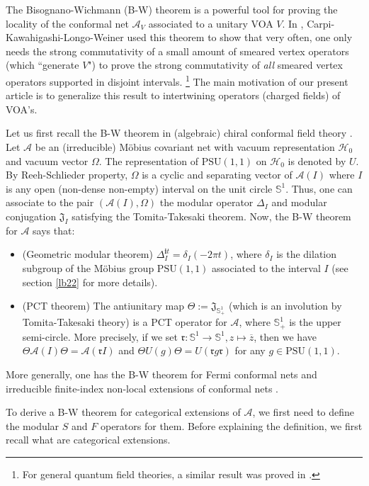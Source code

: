 \documentclass[12pt,a4paper]{article}
\theoremstyle{definition}
\theoremstyle{plain}
\newcommand{\fk}{\mathfrak}
\newcommand{\mc}{\mathcal}
\newcommand{\ovl}{\overline}
\newcommand{\PSU}{\mathrm{PSU}(1,1)}
\newcommand{\im}{\mathbf{i}}
\newcommand{\mbb}{\mathbb}
\numberwithin{equation}{section}
\begin{document}
The Bisognano-Wichmann (B-W) theorem \cite{BW75} is a powerful tool for proving the locality of the conformal net $\mc A_V$ associated to a unitary VOA $V$. In \cite{CKLW18}, Carpi-Kawahigashi-Longo-Weiner used this theorem to show that very often, one only needs the strong commutativity of a small amount of  smeared vertex operators (which ``generate $V$") to prove the strong commutativity of \emph{all} smeared vertex operators supported in disjoint intervals. \footnote{For general quantum field theories, a similar result was proved in \cite{DSW86}.} The main motivation of our present article is to generalize this result to intertwining operators (charged fields) of VOA's. 

Let us first recall the B-W theorem in (algebraic) chiral conformal field theory \cite{BGL93,GF93,FJ96}. Let $\mc A$ be an (irreducible) M\"obius covariant net with vacuum representation $\mc H_0$ and vacuum vector $\Omega$. The representation of $\PSU$ on $\mc H_0$ is denoted by $U$. By Reeh-Schlieder property, $\Omega$ is a cyclic and separating vector of $\mc A(I)$ where $I$ is any open (non-dense non-empty) interval on the unit circle $\mbb S^1$. Thus, one can associate to  the pair $(\mc A(I),\Omega)$ the modular operator $\Delta_I$ and modular conjugation $\fk J_I$ satisfying the Tomita-Takesaki theorem. Now, the B-W theorem for $\mc A$ says that:
\begin{itemize}
\item (Geometric modular theorem) $\Delta_I^{\im t}=\delta_I(-2\pi t)$, where $\delta_I$ is the dilation subgroup of the M\"obius group $\PSU$ associated to the interval $I$ (see section \ref{lb22} for more details).
\item (PCT theorem) The antiunitary map $\Theta:=\fk J_{\mbb S^1_+}$ (which is an involution by Tomita-Takesaki theory) is a PCT operator for $\mc A$, where $\mbb S^1_+$ is the upper semi-circle. More precisely, if we set $\fk r:\mbb S^1\rightarrow\mbb S^1,z\mapsto\ovl z$, then we have $\Theta\mc A(I)\Theta=\mc A(\fk rI)$ and $\Theta U(g)\Theta=U(\fk rg\fk r)$ for any $g\in\PSU$.
\end{itemize}
More generally, one has the B-W theorem for Fermi conformal nets \cite{ALR01,CKL08} and irreducible finite-index non-local extensions of conformal nets \cite{LR04}. 



To derive a B-W theorem for categorical extensions of $\mc A$, we first need to define the modular $S$ and $F$ operators for them. Before explaining the definition, we first recall what are categorical extensions.
\end{document}
